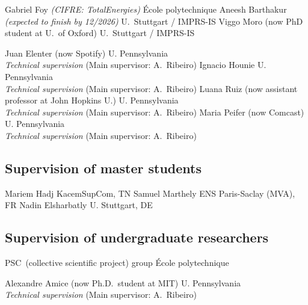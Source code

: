 \documentclass[highlights,publist]{cvlfoc}
\begin{document}
\begin{entrydate}
		{Gabriel Foy \emph{(CIFRE: TotalEnergies)} \hfill \'{E}cole polytechnique}
		{Aneesh Barthakur \emph{(expected to finish by 12/2026)} \hfill U.\ Stuttgart / IMPRS-IS}
		{Viggo Moro {\small (now PhD student at U.\ of Oxford)} \hfill U.\ Stuttgart / IMPRS-IS}

\end{entrydate}

\medskip
\begin{entrydate}
		{Juan Elenter {\small (now Spotify)}
		\hfill U. Pennsylvania\\
			\emph{Technical supervision} \hfill(Main supervisor: A.\ Ribeiro)}
		{Ignacio Hounie \hfill U. Pennsylvania\\
			\emph{Technical supervision} \hfill(Main supervisor: A.\ Ribeiro)}
		{Luana Ruiz {\small (now assistant professor at John Hopkins U.)}
			\hfill U. Pennsylvania\\
			\emph{Technical supervision} \hfill(Main supervisor: A.\ Ribeiro)}
		{Maria Peifer {\small (now Comcast)}
		\hfill U. Pennsylvania\\
			\emph{Technical supervision} \hfill(Main supervisor: A.\ Ribeiro)}
\end{entrydate}



\bigskip
\subsection*{Supervision of master students}

\begin{entrydate}
		{Mariem Hadj Kacem\hfill SupCom, TN}
		{Samuel Marthely \hfill ENS Paris-Saclay (MVA), FR}
		{Nadin Elsharbatly \hfill U. Stuttgart, DE}
\end{entrydate}


\bigskip
\subsection*{Supervision of undergraduate researchers}

\begin{entrydate}
		{PSC~(collective scientific project) group
		\hfill \'{E}cole polytechnique}

		{Alexandre Amice {\small (now Ph.D.\ student at MIT)}
		\hfill U. Pennsylvania\\
		\emph{Technical supervision} \hfill(Main supervisor: A.\ Ribeiro)}
\end{entrydate}
\end{document}
